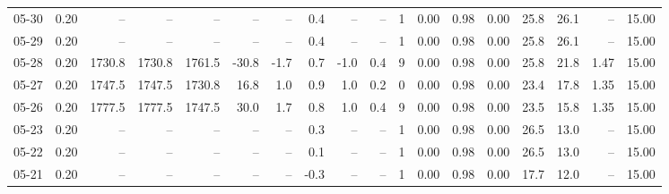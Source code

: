 \begin{threeparttable}
{\begin{tabular}{lrrrrrrrrrrrrrrrrr}
  05-30 &     0.20 &     -- &     -- &     -- &         -- &             -- &                       0.4 &                       -- &                  -- &              1 &       0.00 &      0.98 &           0.00 &             25.8 &                26.1 &              -- &                  15.00 \\
  05-29 &     0.20 &     -- &     -- &     -- &         -- &             -- &                       0.4 &                       -- &                  -- &              1 &       0.00 &      0.98 &           0.00 &             25.8 &                26.1 &              -- &                  15.00 \\
  05-28 &     0.20 & 1730.8 & 1730.8 & 1761.5 &      -30.8 &           -1.7 &                       0.7 &                     -1.0 &                 0.4 &              9 &       0.00 &      0.98 &           0.00 &             25.8 &                21.8 &            1.47 &                  15.00 \\
  05-27 &     0.20 & 1747.5 & 1747.5 & 1730.8 &       16.8 &            1.0 &                       0.9 &                      1.0 &                 0.2 &              0 &       0.00 &      0.98 &           0.00 &             23.4 &                17.8 &            1.35 &                  15.00 \\
  05-26 &     0.20 & 1777.5 & 1777.5 & 1747.5 &       30.0 &            1.7 &                       0.8 &                      1.0 &                 0.4 &              9 &       0.00 &      0.98 &           0.00 &             23.5 &                15.8 &            1.35 &                  15.00 \\
  05-23 &     0.20 &     -- &     -- &     -- &         -- &             -- &                       0.3 &                       -- &                  -- &              1 &       0.00 &      0.98 &           0.00 &             26.5 &                13.0 &              -- &                  15.00 \\
  05-22 &     0.20 &     -- &     -- &     -- &         -- &             -- &                       0.1 &                       -- &                  -- &              1 &       0.00 &      0.98 &           0.00 &             26.5 &                13.0 &              -- &                  15.00 \\
  05-21 &     0.20 &     -- &     -- &     -- &         -- &             -- &                      -0.3 &                       -- &                  -- &              1 &       0.00 &      0.98 &           0.00 &             17.7 &                12.0 &              -- &                  15.00 \\

\end{tabular}}
\end{threeparttable}
